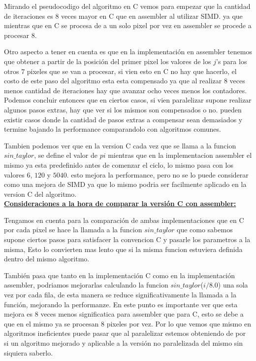Mirando el pseudocodigo del algoritmo en C vemos para empezar que la cantidad de iteraciones es 8 veces mayor en C que en assembler al utilizar SIMD. ya que mientras que en C se procesa de a un solo pixel por vez en assembler se procede a procesar 8.

Otro aspecto a tener en cuenta es que en la implementación en assembler tenemos que obtener a partir de la posición del primer pixel los valores de los $j$'s para los otros $7$ pixeles que se van a procesar, si vien esto en C no hay que hacerlo, el costo de este paso del algoritmo esta esta compensado ya que al realizar 8 veces menos cantidad de iteraciones hay que avanzar ocho veces menos los contadores. Podemos concluir entonces que en ciertos casos, si vien paralelizar supone realizar algunos pasos extras, hay que ver si los mismos son compensados o no. pueden existir casos donde la cantidad de pasos extras a compensar sean demasiados y termine bajando la performance comparandolo con algoritmos comunes.

Tambien podemos ver que en la version C cada vez que se llama a la funcion $sin\_taylor$, se define el valor de $pi$ mientras que en la implementacion assembler el mismo ya esta predefinido antes de comenzar el ciclo, lo mismo pasa con los valores $6$, $120$ y $5040$. esto mejora la performance, pero no se lo puede considerar como una mejora de SIMD ya que lo mismo podria ser facilmente aplicado en la version C del algoritmo.\\

\underline{\textbf{Consideraciones a la hora de comparar la versión C con assembler:}}

Tengamos en cuenta para la comparación de ambas implementaciones que en C por cada pixel se hace la llamada a la funcion $sin\_taylor$ que como sabemos supone ciertos pasos para satisfacer la convencion C y pasarle los parametros a la misma, Esto lo convierten mas lento que si la misma funcion estuviera definida dentro del mismo algoritmo.

También pasa que tanto en la implementación C como en la implementación assembler, podriamos mejorarlas calculando la funcion $sin\_taylor$($i/8.0$) una sola vez por cada fila, de esta manera se reduce significativamente la llamada a la función, mejorando la performanze. En este punto es importante ver que esta mejora es $8$ veces menos significatica para assembler que para C, esto se debe a que en el mismo ya se procesan 8 pixeles por vez. Por lo que vemos que mismo en algoritmos ineficientes puede pasar que al paralelizar estemos obteniendo de por si un algoritmo mejorado y aplicable a la versión no paralelizada del mismo sin siquiera saberlo.

